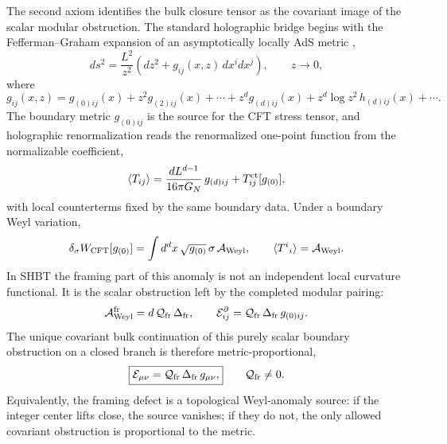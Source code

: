 \documentclass[11pt]{article}
\newcommand{\Deltafr}{\Delta_{\rm fr}}
\newcommand{\GN}{G_N}
\newcommand{\Ebulk}{\mathcal E_{\mu\nu}}
\begin{document}
The second axiom identifies the bulk closure tensor as the covariant image of
the scalar modular obstruction.  The standard holographic bridge begins with
the Fefferman--Graham expansion of an asymptotically locally AdS metric
\cite{fefferman1985,skenderis2002},
\begin{equation}
\label{eq:section-two-fg-metric}
 ds^2
 =
 \frac{L^2}{z^2}
 \left(dz^2+g_{ij}(x,z)\,dx^i dx^j\right),
 \qquad
 z\to0,
\end{equation}
where
\begin{equation}
\label{eq:section-two-fg-expansion}
 g_{ij}(x,z)
 =
 g_{(0)ij}(x)
 +z^2g_{(2)ij}(x)
 +\cdots
 +z^d g_{(d)ij}(x)
 +z^d\log z^2\,h_{(d)ij}(x)
 +\cdots .
\end{equation}
The boundary metric $g_{(0)ij}$ is the source for the CFT stress tensor, and
holographic renormalization reads the renormalized one-point function from the
normalizable coefficient,
\begin{equation}
\label{eq:section-two-holographic-stress-tensor}
 \langle T_{ij}\rangle
 =
 \frac{dL^{d-1}}{16\pi\GN}\,g_{(d)ij}
 +T^{\rm ct}_{ij}[g_{(0)}],
\end{equation}
with local counterterms fixed by the same boundary data.  Under a boundary Weyl
variation,
\begin{equation}
\label{eq:section-two-weyl-anomaly}
 \delta_{\sigma}W_{\rm CFT}[g_{(0)}]
 =
 \int d^d x\,\sqrt{g_{(0)}}\,\sigma\,\mathcal A_{\rm Weyl},
 \qquad
 \langle T^i{}_{i}\rangle=\mathcal A_{\rm Weyl}.
\end{equation}
In SHBT the framing part of this anomaly is not an independent local curvature
functional.  It is the scalar obstruction left by the completed modular
pairing:
\begin{equation}
\label{eq:section-two-framing-weyl-anomaly}
 \mathcal A_{\rm Weyl}^{\rm fr}
 =
 d\,\mathcal Q_{\rm fr}\,\Deltafr,
 \qquad
 \mathcal E^{\partial}_{ij}
 =
 \mathcal Q_{\rm fr}\,\Deltafr\,g_{(0)ij}.
\end{equation}
The unique covariant bulk continuation of this purely scalar boundary
obstruction on a closed branch is therefore metric-proportional,
\begin{equation}
\label{eq:section-two-closure-map}
 \boxed{
 \Ebulk
 =
 \mathcal Q_{\rm fr}\,\Deltafr\,g_{\mu\nu},}
 \qquad
 \mathcal Q_{\rm fr}\ne0.
\end{equation}
Equivalently, the framing defect is a topological Weyl-anomaly source: if the
integer center lifts close, the source vanishes; if they do not, the only
allowed covariant obstruction is proportional to the metric.
\end{document}
